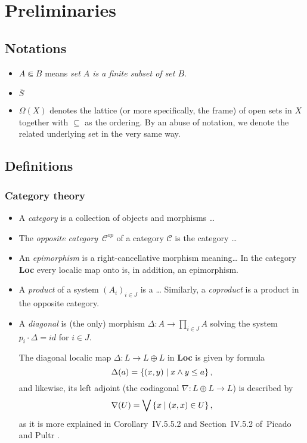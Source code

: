 \chapter*{Preliminaries}

\section*{Notations}

\begin{itemize}
\item $A \Subset B$ means {\sl set $A$ is a finite subset of set $B$\/}.
\item $\overline{S}$ 
\item $\Omega(X)$ denotes the lattice (or more specifically, the frame) of open
sets in $X$ together with $\subseteq$ as the ordering. 
By an abuse of notation, we denote the related underlying set in the very same
way.
\end{itemize}

\section*{Definitions}

\subsection*{Category theory}

\begin{itemize}
\item A \emph{category} is a collection of objects and morphisms \ldots
\item The \emph{opposite category}~$\mathcal{C}^{op}$ of a category
$\mathcal{C}$ is the category \ldots
\item An \emph{epimorphism} is a right-cancellative morphism meaning\ldots
In the category {\bf Loc} every localic map onto is, in addition, an
epimorphism.
\item A \emph{product} of a system $\left(A_i\right)_{i\in J}$ is a \ldots
Similarly, a \emph{coproduct} is a product in the opposite category.
\item A \emph{diagonal} is (the only) morphism $\Delta\colon A \to \prod_{i\in
J} A$ solving the system $p_i\cdot \Delta = id$ for $i \in J$.
  \begin{exmpl} \label{(co)diag-in-Loc}
    The diagonal localic map $\Delta\colon L \to L \oplus L$ in {\bf Loc} is
    given by formula
    \[
      \Delta(a) = \left\{ (x, y) \mid x \wedge y \leq a \right\},
    \]
    and likewise, its left adjoint (the codiagonal $\nabla\colon L \oplus L \to
    L$) is described by
    \[
      \nabla(U) = \bigvee \left\{ x \mid (x, x)\in U \right\},
    \]
    as it is more explained in Corollary~IV.5.5.2 and Section~IV.5.2 of~Picado
    and Pultr \cite{picado-pultr12}.
  \end{exmpl}
\end{itemize}


